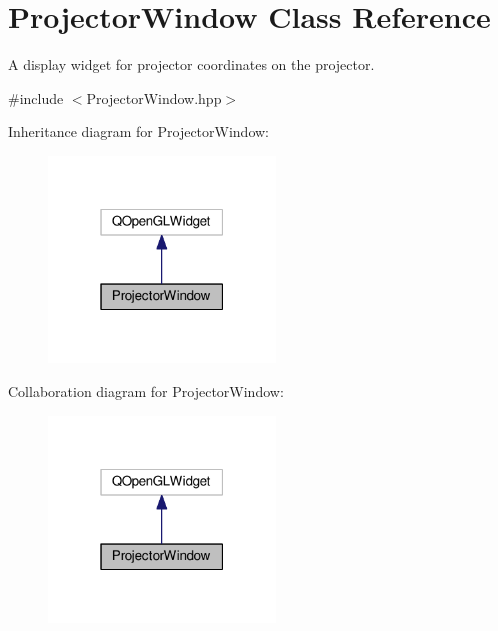 \hypertarget{classProjectorWindow}{}\section{Projector\+Window Class Reference}
\label{classProjectorWindow}


A display widget for projector coordinates on the projector.  




{\ttfamily \#include $<$Projector\+Window.\+hpp$>$}



Inheritance diagram for Projector\+Window\+:\nopagebreak
\begin{figure}[H]
\begin{center}
\leavevmode
\includegraphics[width=171pt]{classProjectorWindow__inherit__graph}
\end{center}
\end{figure}


Collaboration diagram for Projector\+Window\+:\nopagebreak
\begin{figure}[H]
\begin{center}
\leavevmode
\includegraphics[width=171pt]{classProjectorWindow__coll__graph}
\end{center}
\end{figure}
